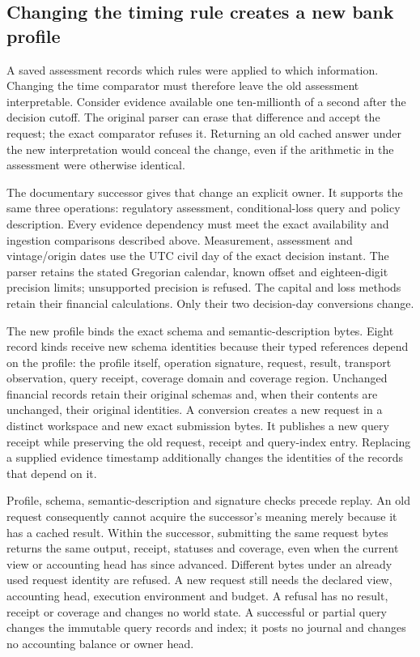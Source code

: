 \subsection{Changing the timing rule creates a new bank profile}
\label{sec:exact-bank-profile}

A saved assessment records which rules were applied to which information.
Changing the time comparator must therefore leave the old assessment
interpretable. Consider evidence available one ten-millionth of a second after
the decision cutoff. The original parser can erase that difference and accept
the request; the exact comparator refuses it. Returning an old cached answer
under the new interpretation would conceal the change, even if the arithmetic
in the assessment were otherwise identical.

The documentary successor  gives that change an
explicit owner. It supports the same three operations: regulatory assessment,
conditional-loss query and policy description. Every evidence dependency must
meet the exact availability and ingestion comparisons described above.
Measurement, assessment and vintage/origin dates use the UTC civil day of the
exact decision instant. The parser retains the stated Gregorian calendar, known
offset and eighteen-digit precision limits; unsupported precision is refused.
The capital and loss methods retain their financial calculations. Only their
two decision-day conversions change.

The new profile binds the exact schema and semantic-description bytes. Eight
record kinds receive new schema identities because their typed references
depend on the profile: the profile itself, operation signature, request,
result, transport observation, query receipt, coverage domain and coverage
region. Unchanged financial records retain their original schemas and, when
their contents are unchanged, their original identities. A conversion creates
a new request in a distinct workspace and new exact submission bytes. It
publishes a new query receipt while preserving the old request, receipt and
query-index entry. Replacing a supplied evidence timestamp additionally changes
the identities of the records that depend on it.

Profile, schema, semantic-description and signature checks precede replay.
An old request consequently cannot acquire the successor's meaning merely
because it has a cached result. Within the successor, submitting the same
request bytes returns the same output, receipt, statuses and coverage, even
when the current view or accounting head has since advanced. Different bytes
under an already used request identity are refused. A new request still needs
the declared view, accounting head, execution environment and budget. A refusal
has no result, receipt or coverage and changes no world state. A successful or
partial query changes the immutable query records and index; it posts no
journal and changes no accounting balance or owner head.


